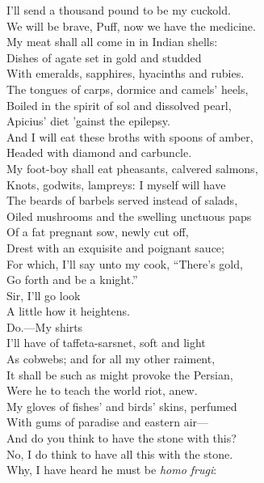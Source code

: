 \documentclass[a4paper,oneside,12pt]{memoir}
\begin{document}
\begin{drama*}
I'll send a thousand pound to be my cuckold.\\
We will be brave, Puff, now we have the medicine.\\
My meat shall all come in in Indian shells:\\
Dishes of agate set in gold and studded\\
With emeralds, sapphires, hyacinths and rubies.\\
The tongues of carps, dormice and camels' heels,\\
Boiled in the spirit of sol and dissolved pearl,\\
Apicius' diet 'gainst the epilepsy.\\
And I will eat these broths with spoons of amber,\\
Headed with diamond and carbuncle.\\
My foot-boy shall eat pheasants, calvered salmons,\\
Knots, godwits, lampreys: I myself will have\\
The beards of barbels served instead of salads,\\
Oiled mushrooms and the swelling unctuous paps\\
Of a fat pregnant sow, newly cut off,\\
Drest with an exquisite and poignant sauce;\\
For which, I'll say unto my cook, ``There's gold,\\
Go forth and be a knight.''\\
\facespeaks {} Sir, I'll go look\\
A little how it heightens.\\
\mammonspeaks {} Do.---My shirts\\
I'll have of taffeta-sarsnet, soft and light\\
As cobwebs; and for all my other raiment,\\
It shall be such as might provoke the Persian,\\
Were he to teach the world riot, anew.\\
My gloves of fishes' and birds' skins, perfumed\\
With gums of paradise and eastern air---\\
\surlyspeaks And do you think to have the stone with this?\\
\mammonspeaks No, I do think to have all this with the stone.\\
\surlyspeaks Why, I have heard he must be \emph{homo frugi}:\\

\end{drama*}
\end{document}
